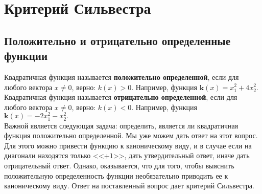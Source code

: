 \section{Критерий Сильвестра}
\subsection{Положительно и отрицательно определенные функции}

Квадратичная функция называется \textbf{положительно определенной}, если для любого вектора $x\neq0$, верно: $k(x)>0.$ Например, функция $\mathbf{k}(x)=x^2_1+4x^2_2.$\\

Квадратичная функция называется \textbf{отрицательно определенной}, если для любого вектора $x\neq0$, верно: $k(x)<0.$ Например, функция $\mathbf{k}(x)=-2x^2_1-x^2_2.$\\


Важной является следующая задача: определить, является ли квадратичная функция положительно определенной. Мы уже можем дать ответ на этот вопрос. Для этого можно привести функцию к каноническому виду, и в случае если на диагонали находятся только <<$+1$>>, дать утвердительный ответ, иначе дать отрицательный ответ. Однако, оказывается, что для того, чтобы выяснить положительную определенность функции необязательно приводить ее к каноническому виду. Ответ на поставленный вопрос дает критерий Сильвестра.

